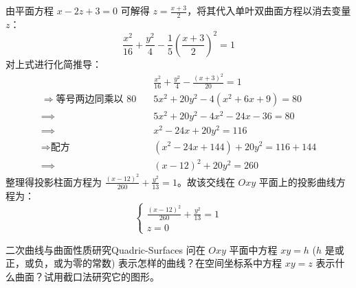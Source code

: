\begin{solution}
    由平面方程 $x - 2z + 3 = 0$ 可解得 $z = \frac{x+3}{2}$，将其代入单叶双曲面方程以消去变量 $z$：
    \begin{equation}
        \frac{x^2}{16} + \frac{y^2}{4} - \frac{1}{5} \left( \frac{x+3}{2} \right)^2 = 1
    \end{equation}
    对上式进行化简推导：
    \begin{equation}
        \begin{aligned}
                                                      & \frac{x^2}{16} + \frac{y^2}{4} - \frac{(x+3)^2}{20} = 1 \\
            \Longrightarrow{\text{等号两边同乘以 } 80} \quad & 5x^2 + 20y^2 - 4(x^2 + 6x + 9) = 80                     \\
            \implies                                  & 5x^2 + 20y^2 - 4x^2 - 24x - 36 = 80                     \\
            \implies                                  & x^2 - 24x + 20y^2 = 116                                 \\
            \Longrightarrow{\text{配方}} \quad          & (x^2 - 24x + 144) + 20y^2 = 116 + 144                   \\
            \implies                                  & (x-12)^2 + 20y^2 = 260
        \end{aligned}
    \end{equation}
    整理得投影柱面方程为 $\frac{(x-12)^2}{260} + \frac{y^2}{13} = 1$。故该交线在 $Oxy$ 平面上的投影曲线方程为：
    \begin{equation}
        \boxed{\begin{cases} \frac{(x-12)^2}{260} + \frac{y^2}{13} = 1 \\ z = 0 \end{cases}}
    \end{equation}
\end{solution}


\begin{problem}{二次曲线与曲面性质研究}{Quadric-Surfaces}
    问在 $Oxy$ 平面中方程 $xy = h$ ($h$ 是或正，或负，或为零的常数) 表示怎样的曲线？在空间坐标系中方程 $xy = z$ 表示什么曲面？试用截口法研究它的图形。
\end{problem}


